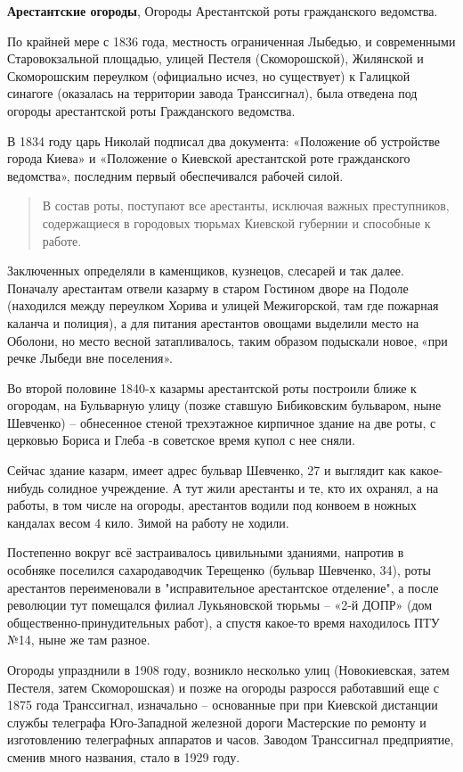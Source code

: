 \medskip


\textbf{Арестантские огороды}, Огороды Арестантской роты гражданского ведомства.

По крайней мере с 1836 года, местность ограниченная Лыбедью, и современными Старовокзальной площадью, улицей Пестеля (Скоморошской), Жилянской и Скоморошским переулком (официально исчез, но существует) к Галицкой синагоге (оказалась на территории завода Транссигнал), была отведена под огороды арестантской роты Гражданского ведомства.

В 1834 году царь Николай подписал два документа: «Положение об устройстве города Киева» и «Положение о Киевской арестантской роте гражданского ведомства», последним первый обеспечивался рабочей силой.

\begin{quotation}
В состав роты, поступают все арестанты, исключая важных преступников, содержащиеся в городовых тюрьмах Киевской губернии и способные к работе.
\end{quotation}

Заключенных определяли в каменщиков, кузнецов, слесарей и так далее. Поначалу арестантам отвели казарму в старом Гостином дворе на Подоле (находился между переулком Хорива и улицей Межигорской, там где пожарная каланча и полиция), а для питания арестантов овощами выделили место на Оболони, но место весной затапливалось, таким образом подыскали новое, «при речке Лыбеди вне поселения».

Во второй половине 1840-х казармы арестантской роты построили ближе к огородам, на Бульварную улицу (позже ставшую Бибиковским бульваром, ныне Шевченко) – обнесенное стеной трехэтажное кирпичное здание на две роты, с церковью Бориса и Глеба -в советское время купол с нее сняли.  

Сейчас здание казарм, имеет адрес бульвар Шевченко, 27 и выглядит как какое-нибудь солидное учреждение. А тут жили арестанты и те, кто их охранял, а на работы, в том числе на огороды, арестантов водили под конвоем в ножных кандалах весом 4 кило. Зимой на работу не ходили.

Постепенно вокруг всё застраивалось цивильными зданиями, напротив в особняке поселился сахародаводчик Терещенко (бульвар Шевченко, 34), роты арестантов переименовали в "исправительное арестантское отделение", а после революции тут помещался филиал Лукьяновской тюрьмы – «2-й ДОПР» (дом общественно-принудительных работ), а спустя какое-то время находилось ПТУ №14, ныне же там разное.

Огороды упразднили в 1908 году, возникло несколько улиц (Новокиевская, затем Пестеля, затем Скоморошская) и позже на огороды разросся работавший еще с 1875 года Транссигнал, изначально – основанные при при Киевской дистанции службы телеграфа Юго-Западной железной дороги Мастерские по ремонту и изготовлению телеграфных аппаратов и часов. Заводом Транссигнал предприятие, сменив много названия, стало в 1929 году.

